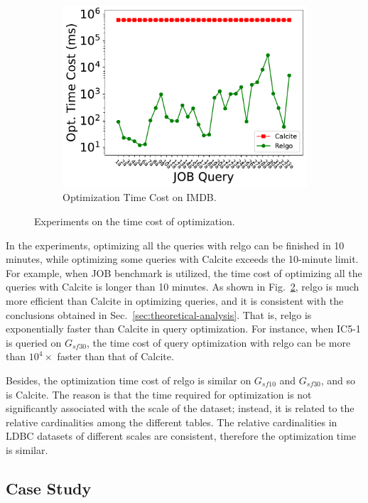 \begin{figure}[ht]
\begin{subfigure}[b]{0.3\linewidth}
        \centering
        \includegraphics[width=\linewidth]{./figures/exp/optimization_job.pdf}
        \caption{Optimization Time Cost on IMDB.}
        \label{fig:exp-optimization-job}
    \end{subfigure}
    \caption{Experiments on the time cost of optimization.}
    \label{fig:exp-optimization}
\end{figure}

In the experiments, optimizing all the queries with relgo can be finished in 10 minutes, while optimizing some queries with Calcite exceeds the 10-minute limit.
For example, when JOB benchmark is utilized, the time cost of optimizing all the queries with Calcite is longer than 10 minutes.
As shown in Fig.~\ref{fig:exp-optimization}, relgo is much more efficient than Calcite in optimizing queries, and it is consistent with the conclusions obtained in Sec.~\ref{sec:theoretical-analysis}.
That is, relgo is exponentially faster than Calcite in query optimization.
For instance, when IC5-1 is queried on $G_{sf30}$, the time cost of query optimization with relgo can be more than $10^4\times$ faster than that of Calcite.

Besides, the optimization time cost of relgo is similar on $G_{sf10}$ and $G_{sf30}$, and so is Calcite.
The reason is that the time required for optimization is not significantly associated with the scale of the dataset; instead, it is related to the relative cardinalities among the different tables.
The relative cardinalities in LDBC datasets of different scales are consistent, therefore the optimization time is similar.



\subsection{Case Study}
\label{sec:experiment-case-study}


